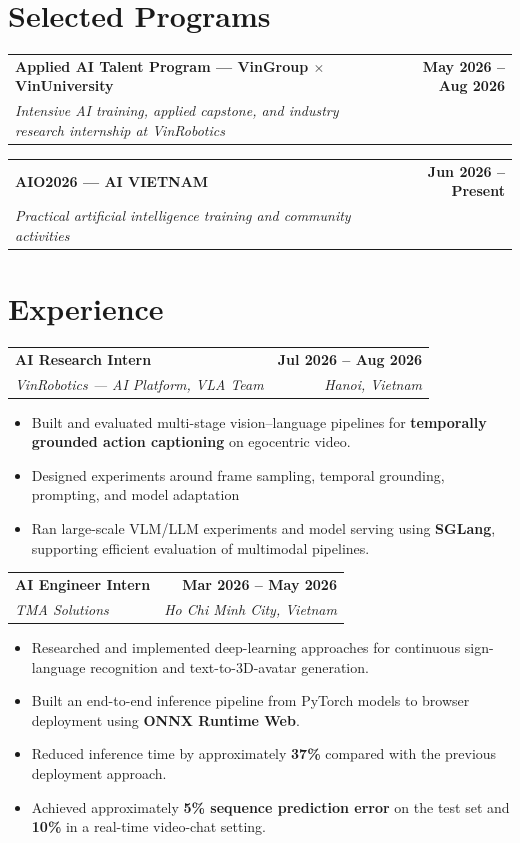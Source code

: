 \documentclass[a4paper,10pt]{article}
\makeatletter
\newcommand{\cvitem}{\itemsep0.55mm\parskip0pt\parsep0pt}
\newcommand{\bulletliststart}{\begin{itemize}[leftmargin=4.2mm,label=\raisebox{0.2ex}{\tiny$\bullet$},topsep=1.1mm] \cvitem}
\newcommand{\bulletlistend}{\end{itemize}\vspace{0.45mm}}
\newcommand{\entry}[4]{%
  \par\noindent
  \begin{tabularx}{\textwidth}{@{}Xr@{}}
    \textbf{#1} & \textbf{#2} \\
    \textit{#3} & \textit{#4}
  \end{tabularx}
  \par\vspace{0.4mm}
}
\newcommand{\experience}[4]{%
  \par\noindent
  \begin{tabularx}{\textwidth}{@{}Xr@{}}
    \textbf{#1} & \textbf{#2} \\
    \textit{#3} & \textit{#4}
  \end{tabularx}
  \par\vspace{0.4mm}
}
\makeatother
\begin{document}
\vspace{-1.2mm}
\section{Selected Programs}
\entry
  {Applied AI Talent Program --- VinGroup $\times$ VinUniversity}
  {May 2026 -- Aug 2026}
  {Intensive AI training, applied capstone, and industry research internship at VinRobotics}
  {}
\vspace{1.2mm}

\entry
  {AIO2026 --- AI VIETNAM}
  {Jun 2026 -- Present}
  {Practical artificial intelligence training and community activities}
  {}

\section{Experience}
\experience
  {AI Research Intern}
  {Jul 2026 -- Aug 2026}
  {VinRobotics --- AI Platform, VLA Team}
  {Hanoi, Vietnam}
\bulletliststart
  \item Built and evaluated multi-stage vision--language pipelines for \textbf{temporally grounded action captioning} on egocentric video.
  \item Designed experiments around frame sampling, temporal grounding, prompting, and model adaptation
  \item Ran large-scale VLM/LLM experiments and model serving using \textbf{SGLang}, supporting efficient evaluation of multimodal pipelines.
\bulletlistend
\vspace{1.2mm}

\experience
  {AI Engineer Intern}
  {Mar 2026 -- May 2026}
  {TMA Solutions}
  {Ho Chi Minh City, Vietnam}
\bulletliststart
  \item Researched and implemented deep-learning approaches for continuous sign-language recognition and text-to-3D-avatar generation.
  \item Built an end-to-end inference pipeline from PyTorch models to browser deployment using \textbf{ONNX Runtime Web}.
  \item Reduced inference time by approximately \textbf{37\%} compared with the previous deployment approach.
  \item Achieved approximately \textbf{5\% sequence prediction error} on the test set and \textbf{10\%} in a real-time video-chat setting.
\bulletlistend

\end{document}
